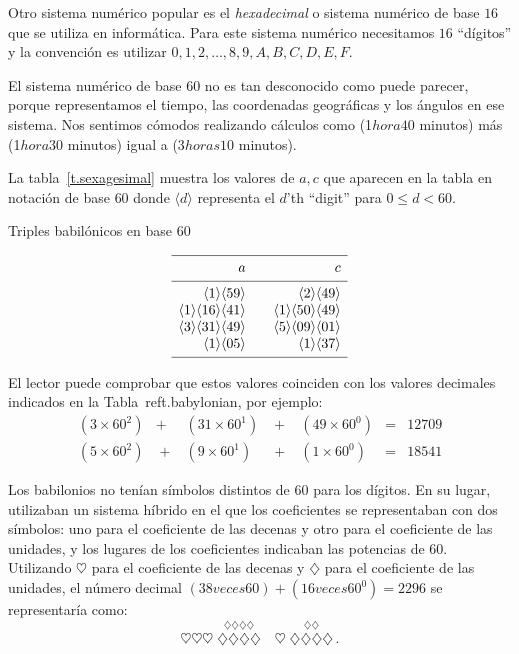 Otro sistema numérico popular es el \emph{hexadecimal} o sistema numérico de base $16$ que se utiliza en informática. Para este sistema numérico necesitamos $16$ ``dígitos'' y la convención es utilizar $0,1,2,\ldots,8,9,A,B,C,D,E,F$.

El sistema numérico de base $60$ no es tan desconocido como puede parecer, porque representamos el tiempo, las coordenadas geográficas y los ángulos en ese sistema. Nos sentimos cómodos realizando cálculos como (1$ hora 40$ minutos) más (1$ hora 30$ minutos) igual a (3$ horas 10$ minutos).

La tabla~\ref{t.sexagesimal} muestra los valores de $a,c$ que aparecen en la tabla en notación de base $60$ donde $\langle d\rangle$ representa el $d$'th ``digit'' para $0\leq d<60$.
\begin{table}[t]
\caption{Triples babilónicos en base $60$}\label{t.sexagesimal}
\[
\begin{array}{r@{$\quad\quad$}r}
\hline
\noalign{\smallskip}
a&c\\
\noalign{\smallskip}\hline\noalign{\smallskip}
\langle 1\rangle \langle 59 \rangle&\langle 2\rangle \langle 49 \rangle\\
\langle 1\rangle \langle 16 \rangle\langle 41\rangle&\langle 1\rangle \langle 50 \rangle\langle 49\rangle\\
\langle 3\rangle \langle 31 \rangle\langle 49\rangle&\langle 5\rangle \langle 09 \rangle\langle 01\rangle\\
\langle 1\rangle \langle 05 \rangle&\langle 1\rangle \langle 37 \rangle\\
\noalign{\smallskip}\hline
\end{array}
\]
\end{table}
El lector puede comprobar que estos valores coinciden con los valores decimales indicados en la Tabla~ref{t.babylonian}, por ejemplo:
\[
\renewcommand{\arraystretch}{1.3}
\begin{array}{lclclcr}
(3\times 60^2) &+& (31\times 60^1) &\;+\;& (49\times 60^0) &=&   12709\\
(5\times 60^2) &\;+\;& (9\times 60^1) &\;+\;& (1\times 60^0) &=& 18541
\end{array}
\]

Los babilonios no tenían símbolos distintos de $60$ para los dígitos. En su lugar, utilizaban un sistema híbrido en el que los coeficientes se representaban con dos símbolos: uno para el coeficiente de las decenas y otro para el coeficiente de las unidades, y los lugares de los coeficientes indicaban las potencias de $60$. Utilizando $\heartsuit$ para el coeficiente de las decenas y $\diamondsuit$ para el coeficiente de las unidades, el número decimal $(38 veces 60)+(16 veces 60^0)=2296$ se representaría como:
\[
\heartsuit\heartsuit\heartsuit \; \stackrel{\displaystyle\diamondsuit\diamondsuit\diamondsuit\diamondsuit}{\diamondsuit\diamondsuit\diamondsuit\diamondsuit}
\quad
\heartsuit \; \stackrel{\displaystyle\diamondsuit\diamondsuit}{\diamondsuit\diamondsuit\diamondsuit\diamondsuit}\,.
\]

